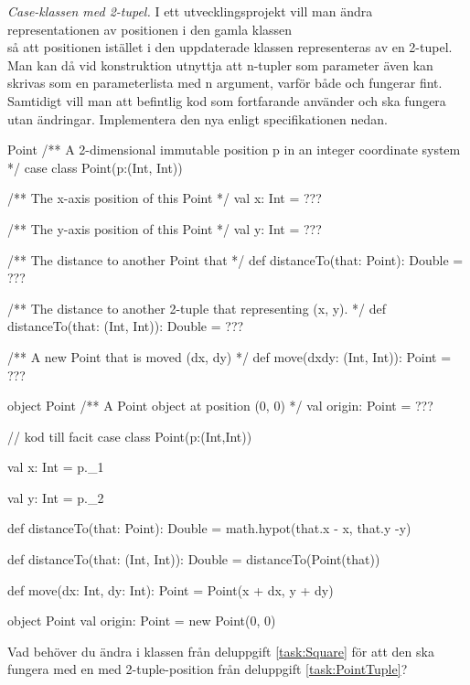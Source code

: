 \Task \label{task:PointTuple} \emph{Case-klassen  med 2-tupel.} I ett utvecklingsprojekt vill man ändra representationen av positionen i den gamla klassen  \\  så att positionen istället i den uppdaterade klassen representeras av en 2-tupel. Man kan då vid konstruktion utnyttja att n-tupler som parameter även kan skrivas som en parameterlista med n argument, varför både  och  fungerar fint. Samtidigt vill man att befintlig kod som fortfarande använder  och  ska fungera utan ändringar.  Implementera den nya  enligt specifikationen nedan. 
\begin{ScalaSpec}{Point}
/** A 2-dimensional immutable position p in an integer coordinate system */ 
case class Point(p:(Int, Int)) {
  /** The x-axis position of this Point */
  val x: Int = ???

  /** The y-axis position of this Point */
  val y: Int = ???

  /** The distance to another Point that */
  def distanceTo(that: Point): Double = ???

  /** The distance to another 2-tuple that representing (x, y). */
  def distanceTo(that: (Int, Int)): Double = ???

  /** A new Point that is moved (dx, dy) */
  def move(dxdy: (Int, Int)): Point = ???
}

object Point {
  /** A Point object at position (0, 0) */ 
  val origin: Point = ???
}
\end{ScalaSpec}

\begin{CodeSmall}
// kod till facit
case class Point(p:(Int,Int)) {
  val x: Int = p._1
  
  val y: Int = p._2
  
  def distanceTo(that: Point): Double = 
    math.hypot(that.x - x, that.y -y)
  
  def distanceTo(that: (Int, Int)): Double = 
    distanceTo(Point(that)) 
  
  def move(dx: Int, dy: Int): Point = Point(x + dx, y + dy)
}

object Point {
  val origin: Point = new Point(0, 0)
}
\end{CodeSmall}



\Task\Pen Vad behöver du ändra i klassen  från deluppgift \ref{task:Square} för att den ska fungera med en  med 2-tuple-position från deluppgift \ref{task:PointTuple}?





